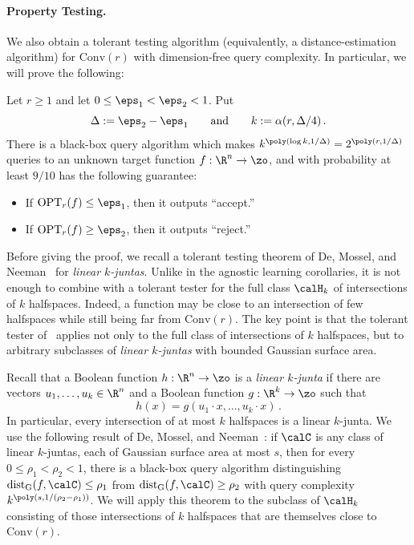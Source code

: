 \documentclass[11pt]{article}
\newcommand{\dG}{\mathrm{dist}_{\mathrm{G}}}
\newcommand{\Conv}{\mathrm{Conv}}
\newcommand{\OPT}{\mathrm{OPT}}
\begin{document}
\paragraph{Property Testing.}

We also obtain a tolerant testing algorithm (equivalently, a distance-estimation algorithm) for $\Conv(r)$ with dimension-free query complexity.  
In particular, we will prove the following: 

\begin{corollary}
	\label{cor:polytope-tolerant-testing}
	Let $r\geq1$ and let $0\leq\eps_1<\eps_2<1$.
	Put
	\[
		\Delta := \eps_2-\eps_1
		\qquad\text{and}\qquad
		k := \alpha(r,\Delta/4)\,.
	\]
	There is a black-box query algorithm which makes $k^{\poly(\log k,1/\Delta)} = 2^{\poly(r,1/\Delta)}$ queries to an unknown target function $f:\R^n\to\zo$, and with probability at least $9/10$ has the following guarantee:
	\begin{itemize}
		\item If $\OPT_r(f)\leq \eps_1$, then it outputs ``accept.''
		\item If $\OPT_r(f)\geq \eps_2$, then it outputs ``reject.''
	\end{itemize}
\end{corollary}

Before giving the proof, we recall a tolerant testing theorem of De, Mossel, and Neeman~\cite{DMN21} for \emph{linear $k$-juntas}. 
Unlike in the agnostic learning corollaries, it is not enough to combine  with a tolerant tester for the full class $\calH_k$ of intersections of $k$ halfspaces.
Indeed, a function may be close to an intersection of few halfspaces while still being far from $\Conv(r)$.
The key point is that the tolerant tester of~\cite{DMN21} applies not only to the full class of intersections of $k$ halfspaces, but to arbitrary subclasses of \emph{linear $k$-juntas} with bounded Gaussian surface area. 

Recall that a Boolean function $h:\R^n\to\zo$ is a \emph{linear $k$-junta} if there are vectors $u_1,\ldots,u_k\in\R^n$ and a Boolean function $g:\R^k\to\zo$ such that
\[
	h(x)=g(u_1\cdot x,\ldots,u_k\cdot x)\,.
\]
In particular, every intersection of at most $k$ halfspaces is a linear $k$-junta.
We use the following result of De, Mossel, and Neeman~\cite[Theorem~1.2]{DMN21}: if $\calC$ is any class of linear $k$-juntas, each of Gaussian surface area at most $s$, then for every $0\leq\rho_1<\rho_2<1$, there is a black-box query algorithm distinguishing $\dG(f,\calC)\leq \rho_1$ from $\dG(f,\calC)\geq \rho_2$ with query complexity $k^{\poly(s,1/(\rho_2-\rho_1))}$. 
We will apply this theorem to the subclass of $\calH_k$ consisting of those intersections of $k$ halfspaces that are themselves close to $\Conv(r)$.
\end{document}
